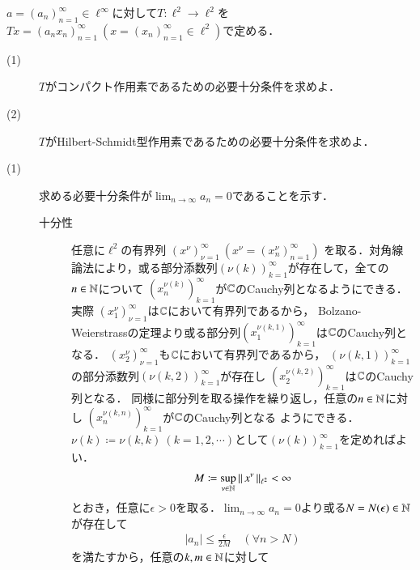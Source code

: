 	\begin{screen}
		[7] $a = (a_n)_{n=1}^{\infty} \in \ell^{\infty}$に対して$T:\ell^2 \rightarrow \ell^2$を
		$Tx = (a_n x_n)_{n=1}^{\infty}\ (x = (x_n)_{n=1}^{\infty} \in \ell^2)$で定める．
		\begin{description}
			\item[(1)] $T$がコンパクト作用素であるための必要十分条件を求めよ．
			\item[(2)] $T$がHilbert-Schmidt型作用素であるための必要十分条件を求めよ．
		\end{description}
	\end{screen}
	
	\begin{prf}\mbox{}
		\begin{description}
			\item[(1)] 求める必要十分条件が$\lim_{n \to \infty} a_n = 0$であることを示す．
				\begin{description}
					\item[十分性] 任意に$\ell^2$の有界列
						$\left( x^{\nu} \right)_{\nu=1}^{\infty}\ \left(x^{\nu} = \left( x^{\nu}_n \right)_{n=1}^{\infty} \right)$
						を取る．対角線論法により，或る部分添数列$(\nu(k))_{k=1}^{\infty}$が存在して，全ての$n \in \mathbb{N}$について
						$\left(x_n^{\nu(k)} \right)_{k=1}^{\infty}$が$\mathbb{C}$のCauchy列となるようにできる．実際
						$\left( x^{\nu}_1 \right)_{\nu=1}^{\infty}$は$\mathbb{C}$において有界列であるから，
						Bolzano-Weierstrassの定理より或る部分列$\left( x^{\nu(k,1)}_1 \right)_{k=1}^{\infty}$は$\mathbb{C}$のCauchy列となる．
						$\left( x^{\nu}_2 \right)_{\nu=1}^{\infty}$も$\mathbb{C}$において有界列であるから，
						$(\nu(k,1))_{k=1}^{\infty}$の部分添数列$(\nu(k,2))_{k=1}^{\infty}$が存在し
						$\left( x^{\nu(k,2)}_2 \right)_{k=1}^{\infty}$は$\mathbb{C}$のCauchy列となる．
						同様に部分列を取る操作を繰り返し，任意の$n \in \mathbb{N}$に対し
						$\left( x^{\nu(k,n)}_n \right)_{k=1}^{\infty}$が$\mathbb{C}$のCauchy列となる
						ようにできる．$\nu(k) \coloneqq \nu(k,k)\ (k=1,2,\cdots)$として$(\nu(k))_{k=1}^{\infty}$を定めればよい．
						\begin{align}
							M \coloneqq \operatorname*{sup}_{\nu \in \mathbb{N}} \left\|\, x^\nu\, \right\|_{\ell^2} < \infty
						\end{align}
						とおき，任意に$\epsilon > 0$を取る．$\lim_{n \to \infty} a_n = 0$より或る$N = N(\epsilon) \in \mathbb{N}$が存在して
						\begin{align}
							|a_n| \leq \frac{\epsilon}{2 M} \quad (\forall n > N)
						\end{align}
						を満たすから，任意の$k,m \in \mathbb{N}$に対して
						\begin{align}

\end{align}
\end{description}
\end{description}
\end{prf}
